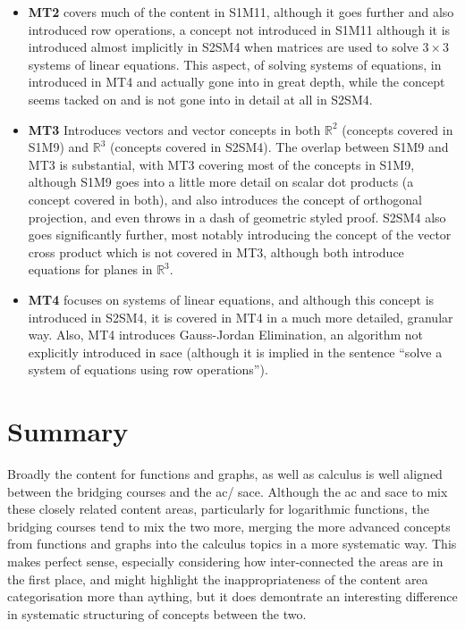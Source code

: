 \documentclass[twoside,12pt,a4paper]{report}
\begin{document}
\begin{itemize}
	\item \textbf{MT2} covers much of the content in S1M11, although it goes further and also introduced row operations, a concept not introduced in S1M11 although it is introduced almost implicitly in S2SM4 when matrices are used to solve $3 \times 3$ systems of linear equations. This aspect, of solving systems of equations, in introduced in MT4 and actually gone into in great depth, while the concept seems tacked on and is not gone into in detail at all in S2SM4.
	\item \textbf{MT3} Introduces vectors and vector concepts in both $\mathbb{R}^2$ (concepts covered in S1M9) and $\mathbb{R}^3$ (concepts covered in S2SM4). The overlap between S1M9 and MT3 is substantial, with MT3 covering most of the concepts in S1M9, although S1M9 goes into a little more detail on scalar dot products (a concept covered in both), and also introduces the concept of orthogonal projection, and even throws in a dash of geometric styled proof. S2SM4 also goes significantly further, most notably introducing the concept of the vector cross product which is not covered in MT3, although both introduce equations for planes in $\mathbb{R}^3$.
	\item \textbf{MT4} focuses on systems of linear equations, and although this concept is introduced in S2SM4, it is covered in MT4 in a much more detailed, granular way. Also, MT4 introduces Gauss-Jordan Elimination, an algorithm not explicitly introduced in \gls{sace} (although it is implied in the sentence ``solve a system of equations using row operations'').
\end{itemize}







\section{Summary}

Broadly the content for functions and graphs, as well as calculus is well aligned between the bridging courses and the \gls{ac}/ \gls{sace}. Although the \gls{ac} and \gls{sace} to mix these closely related content areas, particularly for logarithmic functions, the bridging courses tend to mix the two more, merging the more advanced concepts from functions and graphs into the calculus topics in a more systematic way. This makes perfect sense, especially considering how inter-connected the areas are in the first place, and might highlight the inappropriateness of the content area categorisation more than aything, but it does demontrate an interesting difference in systematic structuring of concepts between the two. 
\end{document}
